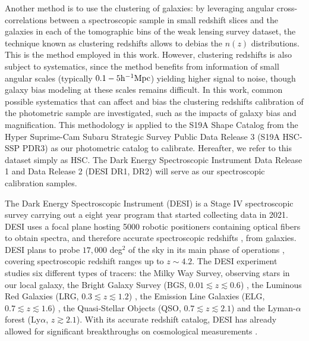 Another method is to use the clustering of galaxies: by leveraging angular cross-correlations between a spectroscopic sample in small redshift slices and the galaxies in each of the tomographic bins of the weak lensing survey dataset, the technique known as clustering redshifts allows to debias \cite{Newman2008ClusterZ,ménard2014clusteringbasedredshiftestimationmethod, Gatti2018DESY1ClusteringRedshifts, Gatti2018DESY1systematics,Gatti2021ClusteringDESWLsrcDistrib, Cawthon2022DESY3Boss,Davis2017DESyear1ClusterZWLsrcdistrib,EuclidClusterRedshifts2025,KidsCrossCorrvdB2020,wright2025kidslegacyClusterZ,HSCClusteringRau2023,Morrison2017TheWiZZClusterZ, Schmidt2013ClusteringRedshifts, McQuinnClusterZ2013} the $n(z)$ distributions. 
This is the method employed in this work. 
However, clustering redshifts is also subject to systematics, since the method benefits from information of small angular scales (typically $0.1-5\mathrm{h}^{-1}\mathrm{Mpc}$) yielding higher signal to noise, though galaxy bias modeling at these scales remains difficult. 
In this work, common possible systematics that can affect and bias the clustering redshifts calibration of the photometric sample are investigated, such as the impacts of galaxy bias and magnification. 
This methodology is applied to the S19A Shape Catalog \cite{HSCShapeCataloguePDR3Li2022} from the Hyper Suprime-Cam Subaru Strategic Survey Public Data Release 3 \cite{HSC2022datarelease3} (S19A HSC-SSP PDR3) as our photometric catalog to calibrate. 
Hereafter, we refer to this dataset simply as HSC. 
The Dark Energy Spectroscopic Instrument Data Release 1 \cite{DESI.DR1.I.Presentation} and Data Release 2 \cite{DESI.DR2.Presentation.InPrep} (DESI DR1, DR2) will serve as our spectroscopic calibration samples.   

The Dark Energy Spectroscopic Instrument (DESI) is a Stage IV spectroscopic survey \cite{DESI2016b.Instr, DESI2022.KP1.Instr, Corrector.Miller.2023} carrying out a eight year program that started collecting data in 2021. DESI uses a focal plane hosting 5000 robotic positioners containing optical fibers \cite{FiberSystem.Poppett.2024} to obtain spectra, and therefore accurate spectroscopic redshifts \cite{Spectro.Pipeline.Guy.2023}, from galaxies. DESI plans to probe $17,000$ deg$^2$ of the sky in its main phase of operations \cite{SurveyOps.Schlafly.2023}, covering spectroscopic redshift ranges up to $z\sim4.2$. The DESI experiment studies six different types of tracers: the Milky Way Survey, observing stars in our local galaxy, the Bright Galaxy Survey (BGS, $0.01\lesssim z\lesssim0.6$) \cite{DESI.Selection.BGS.Hahn2023}, the Luminous Red Galaxies (LRG, $0.3\lesssim z\lesssim1.2$) \cite{DESI.Selection.LRG.Zhou2023}, the Emission Line Galaxies (ELG, $0.7\lesssim z\lesssim1.6$) \cite{DESI.Selection.ELG.Raichoor2023}, the Quasi-Stellar Objects (QSO, $0.7\lesssim z\lesssim2.1$) \cite{DESI.Selection.QSO.Chaussidon2023} and the Lyman-$\alpha$ forest (Ly$\alpha$, $z\gtrsim 2.1$). With its accurate redshift catalog, DESI has already allowed for significant breakthroughs on cosmological measurements \cite{DESI.DR2.II.BAO, DESI2024.VII.KP7B}.

